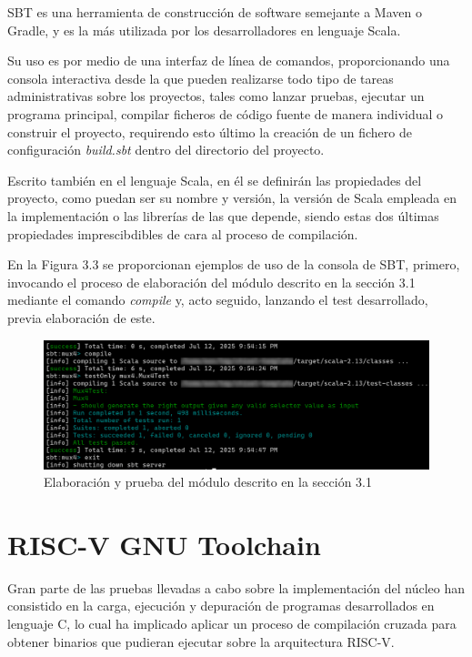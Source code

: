 SBT es una herramienta de construcción de software semejante a Maven o Gradle, y es la más utilizada por los desarrolladores en lenguaje Scala\cite{scalaSurvey}.

Su uso es por medio de una interfaz de línea de comandos, proporcionando una consola interactiva desde la que pueden realizarse todo tipo de tareas administrativas sobre los proyectos, tales como lanzar pruebas, ejecutar un programa principal, compilar ficheros de código fuente de manera individual o construir el proyecto, requirendo esto último la creación de un fichero de configuración \textit{build.sbt} dentro del directorio del proyecto.

Escrito también en el lenguaje Scala, en él se definirán las propiedades del proyecto, como puedan ser su nombre y versión, la versión de Scala empleada en la implementación o las librerías de las que depende, siendo estas dos últimas propiedades imprescibdibles de cara al proceso de compilación.

En la Figura 3.3 se proporcionan ejemplos de uso de la consola de SBT, primero, invocando el proceso de elaboración del módulo descrito en la sección 3.1 mediante el comando \textit{compile} y, acto seguido, lanzando el test desarrollado, previa elaboración de este.

\begin{figure}[h]
  \centering
  \includegraphics[width=0.75\linewidth]{res/img/sbt-usage-basic.png}
  \caption{Elaboración y prueba del módulo descrito en la sección 3.1}
\end{figure}

\section{RISC-V GNU Toolchain}

Gran parte de las pruebas llevadas a cabo sobre la implementación del núcleo han consistido en la carga, ejecución y depuración de programas desarrollados en lenguaje C, lo cual ha implicado aplicar un proceso de compilación cruzada para obtener binarios que pudieran ejecutar sobre la arquitectura RISC-V.

